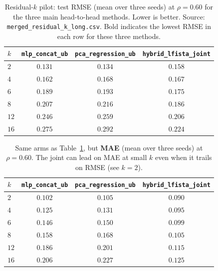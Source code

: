 \begin{table}[t]
  \centering
  \caption{Residual-$k$ pilot: test RMSE (mean over three seeds) at $\rho=0.60$ for the three main head-to-head methods. Lower is better. Source: \texttt{merged\_residual\_k\_long.csv}. Bold indicates the lowest RMSE in each row for these three methods.}
  \label{tab:direct_ub_residual_k_rmse}
  \small
  \begin{tabular}{@{}lccc@{}}
    \toprule
    $k$ & \texttt{mlp\_concat\_ub} & \texttt{pca\_regression\_ub} & \texttt{hybrid\_lfista\_joint} \\
    \midrule
    $2$  & $\mathbf{0.131}$ & $0.134$ & $0.158$ \\
    $4$  & $\mathbf{0.162}$ & $0.168$ & $0.167$ \\
    $6$  & $0.189$ & $0.193$ & $\mathbf{0.175}$ \\
    $8$  & $0.207$ & $0.216$ & $\mathbf{0.186}$ \\
    $12$ & $0.246$ & $0.259$ & $\mathbf{0.206}$ \\
    $16$ & $0.275$ & $0.292$ & $\mathbf{0.224}$ \\
    \bottomrule
  \end{tabular}
\end{table}

\begin{table}[t]
  \centering
  \caption{Same arms as Table~\ref{tab:direct_ub_residual_k_rmse}, but \textbf{MAE} (mean over three seeds) at $\rho=0.60$. The joint can lead on MAE at small $k$ even when it trails on RMSE (see $k=2$).}
  \label{tab:direct_ub_residual_k_mae}
  \small
  \begin{tabular}{@{}lccc@{}}
    \toprule
    $k$ & \texttt{mlp\_concat\_ub} & \texttt{pca\_regression\_ub} & \texttt{hybrid\_lfista\_joint} \\
    \midrule
    $2$  & $0.102$ & $0.105$ & $\mathbf{0.090}$ \\
    $4$  & $0.125$ & $0.131$ & $\mathbf{0.095}$ \\
    $6$  & $0.146$ & $0.150$ & $\mathbf{0.099}$ \\
    $8$  & $0.158$ & $0.168$ & $\mathbf{0.105}$ \\
    $12$ & $0.186$ & $0.201$ & $\mathbf{0.115}$ \\
    $16$ & $0.206$ & $0.227$ & $\mathbf{0.125}$ \\
    \bottomrule
  \end{tabular}
\end{table}

